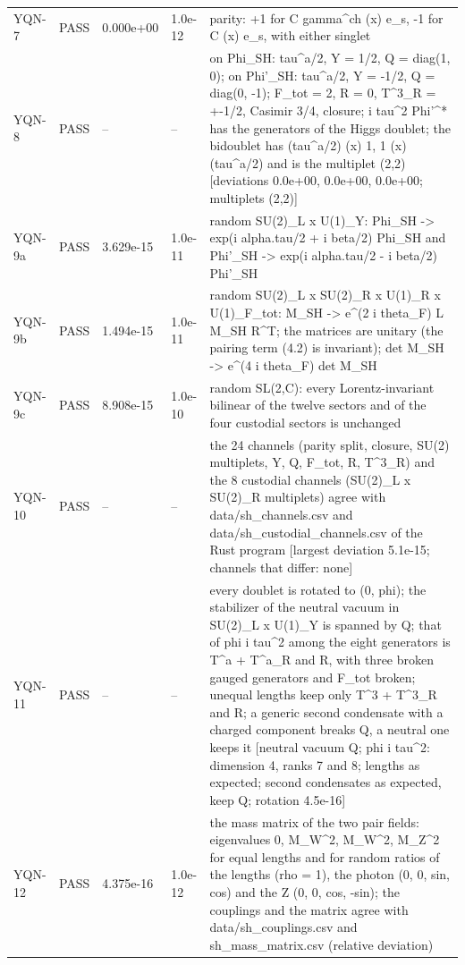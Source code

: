 \documentclass[aps,prd,onecolumn,superscriptaddress,nofootinbib,floatfix,longbibliography]{revtex4-2}
\begin{document}
\begin{longtable}{p{}p{}p{}p{}p{}}
YQN-7 & PASS & 0.000e+00 & 1.0e-12 & parity: +1 for C gamma\textasciicircum{}ch (x) e\_s, -1 for C (x) e\_s, with either singlet \\
YQN-8 & PASS & -- & -- & on Phi\_SH: tau\textasciicircum{}a/2, Y = 1/2, Q = diag(1, 0); on Phi'\_SH: tau\textasciicircum{}a/2, Y = -1/2, Q = diag(0, -1); F\_tot = 2, R = 0, T\textasciicircum{}3\_R = +-1/2, Casimir 3/4, closure; i tau\textasciicircum{}2 Phi'\textasciicircum{}* has the generators of the Higgs doublet; the bidoublet has (tau\textasciicircum{}a/2) (x) 1, 1 (x) (tau\textasciicircum{}a/2) and is the multiplet (2,2) [deviations 0.0e+00, 0.0e+00, 0.0e+00; multiplets (2,2)] \\
YQN-9a & PASS & 3.629e-15 & 1.0e-11 & random SU(2)\_L x U(1)\_Y: Phi\_SH -\textgreater{} exp(i alpha.tau/2 + i beta/2) Phi\_SH and Phi'\_SH -\textgreater{} exp(i alpha.tau/2 - i beta/2) Phi'\_SH \\
YQN-9b & PASS & 1.494e-15 & 1.0e-11 & random SU(2)\_L x SU(2)\_R x U(1)\_R x U(1)\_F\_tot: M\_SH -\textgreater{} e\textasciicircum{}(2 i theta\_F) L M\_SH R\textasciicircum{}T; the matrices are unitary (the pairing term (4.2) is invariant); det M\_SH -\textgreater{} e\textasciicircum{}(4 i theta\_F) det M\_SH \\
YQN-9c & PASS & 8.908e-15 & 1.0e-10 & random SL(2,C): every Lorentz-invariant bilinear of the twelve sectors and of the four custodial sectors is unchanged \\
YQN-10 & PASS & -- & -- & the 24 channels (parity split, closure, SU(2) multiplets, Y, Q, F\_tot, R, T\textasciicircum{}3\_R) and the 8 custodial channels (SU(2)\_L x SU(2)\_R multiplets) agree with data/sh\_channels.csv and data/sh\_custodial\_channels.csv of the Rust program [largest deviation 5.1e-15; channels that differ: none] \\
YQN-11 & PASS & -- & -- & every doublet is rotated to (0, phi); the stabilizer of the neutral vacuum in SU(2)\_L x U(1)\_Y is spanned by Q; that of phi i tau\textasciicircum{}2 among the eight generators is T\textasciicircum{}a + T\textasciicircum{}a\_R and R, with three broken gauged generators and F\_tot broken; unequal lengths keep only T\textasciicircum{}3 + T\textasciicircum{}3\_R and R; a generic second condensate with a charged component breaks Q, a neutral one keeps it [neutral vacuum Q; phi i tau\textasciicircum{}2: dimension 4, ranks 7 and 8; lengths as expected; second condensates as expected, keep Q; rotation 4.5e-16] \\
YQN-12 & PASS & 4.375e-16 & 1.0e-12 & the mass matrix of the two pair fields: eigenvalues 0, M\_W\textasciicircum{}2, M\_W\textasciicircum{}2, M\_Z\textasciicircum{}2 for equal lengths and for random ratios of the lengths (rho = 1), the photon (0, 0, sin, cos) and the Z (0, 0, cos, -sin); the couplings and the matrix agree with data/sh\_couplings.csv and sh\_mass\_matrix.csv (relative deviation) \\
\end{longtable}
\endgroup
\end{document}
